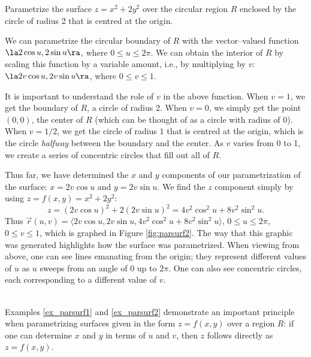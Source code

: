 {Parametrize the surface $z=x^2+2y^2$ over the circular region $R$ enclosed by the circle of radius 2 that is centred at the origin.
}
{We can parametrize the circular boundary of $R$ with the vector--valued function $\la 2\cos u,2\sin u\ra$, where $0\leq u\leq 2\pi$. We can obtain the interior of $R$ by scaling this function by a variable amount, i.e., by multiplying by $v$: $\la 2v\cos u,2v\sin u\ra$, where $0\leq v\leq 1$. 

It is important to understand the role of $v$ in the above function. When $v=1$, we get the boundary of $R$, a circle of radius 2. When $v=0$, we simply get the point $(0,0)$, the center of $R$ (which can be thought of as a circle with radius of 0). When $v=1/2$, we get the circle of radius $1$ that is centred at the origin, which is the circle \emph{halfway} between the boundary and the center. As $v$ varies from 0 to 1, we create a series of concentric circles that fill out all of $R$.


Thus far, we have determined the $x$ and $y$ components of our parametrization of the surface: $x=2v\cos u$ and $y=2v\sin u$. We find the $z$ component simply by using $z = f(x,y) = x^2+2y^2$: 
\[
z = (2v\cos u)^2+2(2v\sin u)^2 = 4v^2\cos^2u+8v^2\sin^2u.
\]
Thus $\vec r(u,v) = \langle 2v\cos u,2v\sin u,4v^2\cos^2u+8v^2\sin^2u\rangle$, $0\leq u\leq 2\pi$, $0\leq v\leq 1$, which is graphed in Figure \ref{fig:parsurf2}. The way that this graphic was generated highlights how the surface was parametrized. When viewing from above, one can see lines emanating from the origin; they represent different values of $u$ as $u$ sweeps from an angle of 0 up to $2\pi$. One can also see concentric circles, each corresponding to a different value of $v$. 
}\\

Examples \ref{ex_parsurf1} and \ref{ex_parsurf2} demonstrate an important principle when parametrizing surfaces given in the form $z=f(x,y)$ over a region $R$: if one can determine $x$ and $y$ in terms of $u$ and $v$, then $z$ follows directly as $z=f(x,y)$. 

